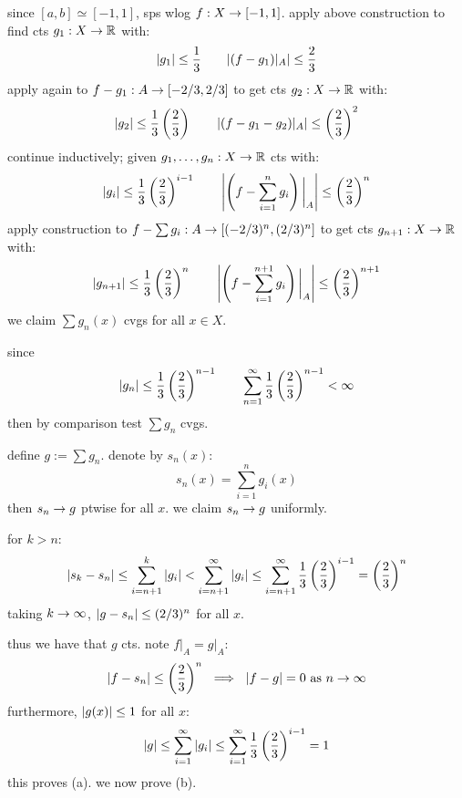 since $[a,b]\simeq[-1,1]$, sps wlog $f:X\rightarrow[-1,1]$.
apply above construction to find cts $g_{1}:X\rightarrow\mathbb{R}$ with:
\begin{equation*}
    \abs{g_{1}}\leq\frac{1}{3} \qquad \abs{(f-g_{1})\rvert_{A}}\leq\frac{2}{3}
\end{equation*}
apply again to $f-g_{1}:A\rightarrow[-2/3,2/3]$ to get cts $g_{2}:X\rightarrow\mathbb{R}$ with:
\begin{equation*}
    \abs{g_{2}}\leq\frac{1}{3}\left( \frac{2}{3} \right) \qquad
    \abs{(f-g_{1}-g_{2})\rvert_{A}}\leq \left( \frac{2}{3} \right)^{2}
\end{equation*}
continue inductively; given $g_{1},\dots,g_{n}:X\rightarrow\mathbb{R}$ cts with:
\begin{equation*}
    \abs{g_{i}}\leq\frac{1}{3}\left( \frac{2}{3} \right)^{i-1} \qquad
    \abs{\left( f-\sum_{i=1}^{n}g_{i} \right)\bigg\rvert_{A}}\leq
    \left( \frac{2}{3} \right)^{n}
\end{equation*}
apply construction to $f-\sum g_{i}:A\rightarrow[(-2/3)^{n},(2/3)^{n}]$ to get
cts $g_{n+1}:X\rightarrow\mathbb{R}$ with:
\begin{equation*}
    \abs{g_{n+1}}\leq\frac{1}{3}\left( \frac{2}{3} \right)^{n} \qquad
    \abs{\left(f-\sum_{i=1}^{n+1}g_{i}\right)\bigg\rvert_{A}}\leq
    \left( \frac{2}{3} \right)^{n+1}
\end{equation*}
we claim $\sum g_{n}(x)$ cvgs for all $x\in X$.
\begin{block}
    since
    \begin{equation*}
        \abs{g_{n}}\leq\frac{1}{3}\left( \frac{2}{3} \right)^{n-1} \qquad
        \sum_{n=1}^{\infty}\frac{1}{3}\left( \frac{2}{3} \right)^{n-1}<\infty
    \end{equation*}
    then by comparison test $\sum g_{n}$ cvgs.
\end{block}
define $g:=\sum g_{n}$. denote by $s_{n}(x)$:
\begin{equation*}
    s_{n}(x)=\sum_{i=1}^{n}g_{i}(x)
\end{equation*}
then $s_{n}\rightarrow g$ ptwise for all $x$.
we claim $s_{n}\rightarrow g$ uniformly.
\begin{block}
    for $k>n$:
    \begin{equation*}
        \abs{s_{k}-s_{n}}\leq\sum_{i=n+1}^{k}\abs{g_{i}}
        <\sum_{i=n+1}^{\infty}\abs{g_{i}}
        \leq\sum_{i=n+1}^{\infty}\frac{1}{3}\left( \frac{2}{3} \right)^{i-1}
        =\left( \frac{2}{3} \right)^{n}
    \end{equation*}
    taking $k\rightarrow\infty$, $\abs{g-s_{n}}\leq(2/3)^{n}$ for all $x$.
\end{block}
thus we have that $g$ cts.
note $f\rvert_{A}=g\rvert_{A}$:
\begin{equation*}
    \abs{f-s_{n}}\leq \left( \frac{2}{3} \right)^{n} \ \implies \
    \abs{f-g}=0 \textrm{ as } n\rightarrow\infty
\end{equation*}
furthermore, $\abs{g(x)}\leq1$ for all $x$:
\begin{equation*}
    \abs{g}\leq\sum_{i=1}^{\infty}\abs{g_{i}}\leq\sum_{i=1}^{\infty}
    \frac{1}{3}\left( \frac{2}{3} \right)^{i-1}=1
\end{equation*}
this proves (a). we now prove (b).

